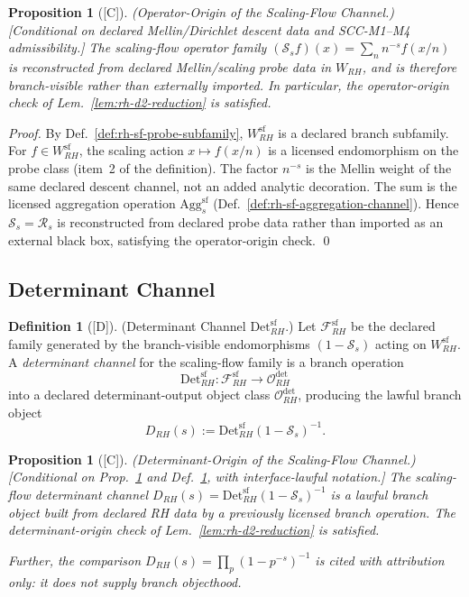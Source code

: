 \documentclass[12pt,oneside]{amsbook}
\theoremstyle{plain}
\newtheorem{proposition}[theorem]{Proposition}
\theoremstyle{definition}
\newtheorem{definition}[theorem]{Definition}
\theoremstyle{remark}
\newcommand{\status}[1]{\textup{[#1]}}
\begin{document}
\begin{proposition}[\status{C}]\label{prop:rh-sf-operator-origin}
\textup{(Operator-Origin of the Scaling-Flow Channel.)}
\textup{[Conditional on declared Mellin/Dirichlet descent data and
SCC-M1--M4 admissibility.]}
The scaling-flow operator family $(\mathcal{S}_s f)(x) = \sum_n
n^{-s} f(x/n)$ is reconstructed from declared Mellin/scaling probe
data in $W_{RH}$, and is therefore branch-visible rather than
externally imported. In particular, the operator-origin check of
Lem.~\ref{lem:rh-d2-reduction} is satisfied.
\end{proposition}

\begin{proof}
By Def.~\ref{def:rh-sf-probe-subfamily}, $W_{RH}^{\mathrm{sf}}$ is
a declared branch subfamily. For $f \in W_{RH}^{\mathrm{sf}}$, the
scaling action $x \mapsto f(x/n)$ is a licensed endomorphism on the
probe class (item~2 of the definition). The factor $n^{-s}$ is the
Mellin weight of the same declared descent channel, not an added
analytic decoration. The sum is the licensed aggregation operation
$\mathrm{Agg}^{\mathrm{sf}}_s$ (Def.~\ref{def:rh-sf-aggregation-channel}).
Hence $\mathcal{S}_s = \mathcal{R}_s$ is reconstructed from declared
probe data rather than imported as an external black box, satisfying
the operator-origin check. \qed
\end{proof}

\subsection{Determinant Channel}

\begin{definition}[\status{D}]\label{def:rh-det-channel-local}
\textup{(Determinant Channel $\mathrm{Det}_{RH}^{\mathrm{sf}}$.)}
Let $\mathcal{F}_{RH}^{\mathrm{sf}}$ be the declared family generated
by the branch-visible endomorphisms $(1-\mathcal{S}_s)$ acting on
$W_{RH}^{\mathrm{sf}}$. A \emph{determinant channel} for the
scaling-flow family is a branch operation
\[
 \mathrm{Det}_{RH}^{\mathrm{sf}}:
 \mathcal{F}_{RH}^{\mathrm{sf}} \to \mathcal{O}_{RH}^{\det}
\]
into a declared determinant-output object class
$\mathcal{O}_{RH}^{\det}$, producing the lawful branch object
\[
 D_{RH}(s) := \mathrm{Det}_{RH}^{\mathrm{sf}}(1-\mathcal{S}_s)^{-1}.
\]
\end{definition}

\begin{proposition}[\status{C}]\label{prop:rh-sf-determinant-origin}
\textup{(Determinant-Origin of the Scaling-Flow Channel.)}
\textup{[Conditional on Prop.~\ref{prop:rh-sf-operator-origin} and
Def.~\ref{def:rh-det-channel-local}, with interface-lawful notation.]}
The scaling-flow determinant channel $D_{RH}(s) = \mathrm{Det}^{\mathrm{sf}}_{RH}
(1-\mathcal{S}_s)^{-1}$ is a lawful branch object built from
declared RH data by a previously licensed branch operation. The
determinant-origin check of Lem.~\ref{lem:rh-d2-reduction} is
satisfied.

Further, the comparison $D_{RH}(s) = \prod_p(1-p^{-s})^{-1}$ is
cited with attribution only: it does not supply branch objecthood.
\end{proposition}
\end{document}
